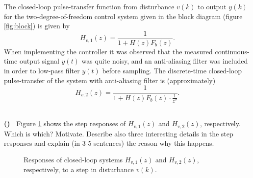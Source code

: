 \documentclass[letterpaper,12pt]{scrartcl}
\newenvironment{exercise}[1][Problem]{\begin{trivlist} \item[\hskip
    \labelsep {\stepcounter{exerctr}\bfseries #1
      \arabic{exerctr}}]}{\end{trivlist}\vspace{10mm}}
\newcounter{exerctr}
\newcounter{abcctr}[exerctr]
\newcommand{\abc}{\noindent\vspace{1mm}\\ {\bf
    \stepcounter{abcctr}(\alph{abcctr})\ }}
\begin{document}
\begin{exercise}

The closed-loop pulse-transfer function from disturbance $v(k)$ to output $y(k)$ for the two-degree-of-freedom control system given in the block diagram (figure \ref{fig:block}) is given by
\begin{equation}
 H_{v,1}(z) = \frac{1}{1 + H(z)F_b(z)}.
 \label{eq:Hv}
\end{equation}
When implementing the controller it was observed that the measured continuous-time output signal $y(t)$ was quite noisy, and an anti-aliasing filter was included in order to low-pass filter $y(t)$ before sampling. The discrete-time closed-loop pulse-transfer of the system with anti-aliasing filter is (approximately)
\begin{equation}
 H_{v,2}(z) = \frac{1}{1 + H(z)F_b(z)\cdot\frac{1}{z^2}}.
 \label{eq:Hv2}
\end{equation}

\abc
Figure \ref{fig:clstep} shows the step responses of $H_{v,1}(z)$ and $H_{v,2}(z)$, respectively. Which is which? Motivate. Describe also three interesting details in the step responses and explain (in 3-5 sentences) the reason why this happens.
 

\begin{figure}[h]
\begin{center}
\caption{Responses of closed-loop systems $H_{v,1}(z)$ and $H_{v,2}(z)$, respectively, to a step in disturbance $v(k)$.}
\label{fig:clstep}
\end{center}
\end{figure}


\end{exercise}
\end{document}
